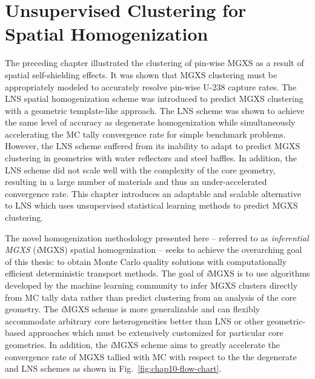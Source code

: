 \chapter{Unsupervised Clustering for Spatial Homogenization}
\label{chap:unsupervised}

The preceding chapter illustrated the clustering of pin-wise \ac{MGXS} as a result of spatial self-shielding effects. It was shown that \ac{MGXS} clustering must be appropriately modeled to accurately resolve pin-wise U-238 capture rates. The \ac{LNS} spatial homogenization scheme was introduced to predict \ac{MGXS} clustering with a geometric template-like approach. The \ac{LNS} scheme was shown to achieve the same level of accuracy as degenerate homogenization while simultaneously accelerating the \ac{MC} tally convergence rate for simple benchmark problems. However, the \ac{LNS} scheme suffered from its inability to adapt to predict \ac{MGXS} clustering in geometries with water reflectors and steel baffles. In addition, the \ac{LNS} scheme did not scale well with the complexity of the core geometry, resulting in a large number of materials and thus an under-accelerated convergence rate. This chapter introduces an adaptable and scalable alternative to \ac{LNS} which uses unsupervised statistical learning methods to predict \ac{MGXS} clustering.

The novel homogenization methodology presented here -- referred to as \textit{inferential \ac{MGXS}} (\textit{i}\ac{MGXS}) spatial homogenization -- seeks to achieve the overarching goal of this thesis: to obtain Monte Carlo quality solutions with computationally efficient deterministic transport methods. The goal of \textit{i}\ac{MGXS} is to use algorithms developed by the machine learning community to infer \ac{MGXS} clusters directly from \ac{MC} tally data rather than predict clustering from an analysis of the core geometry. The \textit{i}\ac{MGXS} scheme is more generalizable and can flexibly accommodate arbitrary core heterogeneities better than \ac{LNS} or other geometric-based approaches which must be extensively customized for particular core geometries. In addition, the \textit{i}\ac{MGXS} scheme aims to greatly accelerate the convergence rate of \ac{MGXS} tallied with \ac{MC} with respect to the the degenerate and \ac{LNS} schemes as shown in Fig.~\ref{fig:chap10-flow-chart}.

